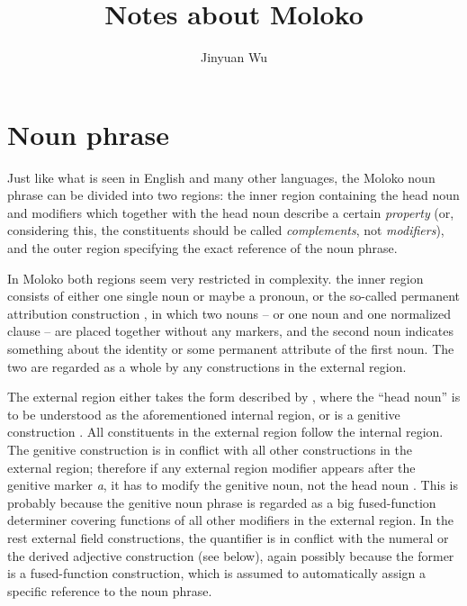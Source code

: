 \documentclass[a4paper, oneside, 12pt]{report}
\title{Notes about Moloko}
\author{Jinyuan Wu}
\newcommand*{\citesec}[1]{\S~{#1}}
\newcommand*{\citefig}[1]{Fig.~{#1}}
\newcommand*{\citepage}[1]{p.~{#1}}
\newcommand*{\term}[1]{\emph{#1}}
\newcommand{\form}[1]{\emph{#1}}
\begin{document}
\automath

\maketitle

\chapter{Noun phrase}

Just like what is seen in English and many other languages,
the Moloko noun phrase can be divided into two regions:
the inner region containing the head noun 
and modifiers which together with the head noun 
describe a certain \emph{property} 
(or, considering this, the constituents should be called \term{complements}, 
not \term{modifiers}),
and the outer region specifying the exact reference of the noun phrase.

In Moloko both regions seem very restricted in complexity.
the inner region consists of either one single noun or maybe a pronoun, 
or the so-called permanent attribution construction 
\citep[\citesec{5.4.2}]{friesen2017grammar},
in which two nouns -- or one noun and one normalized clause -- 
are placed together without any markers, 
and the second noun indicates something about the identity 
or some permanent attribute of the first noun.
The two are regarded as a whole by any constructions in the external region.

The external region either takes the form described by  
\citet[\citepage{145}, \citefig{5.1}]{friesen2017grammar},
where the ``head noun'' is to be understood as 
the aforementioned internal region,
or is a genitive construction \citep[\citesec{5.4.1}]{friesen2017grammar}.
All constituents in the external region follow the internal region.
The genitive construction is in conflict with all other constructions in the external region; 
therefore if any external region modifier appears after the genitive marker \form{a},
it has to modify the genitive noun, not the head noun
\citep[\citepage{159}]{friesen2017grammar}.
This is probably because the genitive noun phrase 
is regarded as a big fused-function determiner 
covering functions of all other modifiers in the external region.
In the rest external field constructions, 
the quantifier is in conflict with the numeral 
or the derived adjective construction (see below),
again possibly because the former is a fused-function construction, 
which is assumed to automatically assign a specific reference to the noun phrase.
\end{document}
